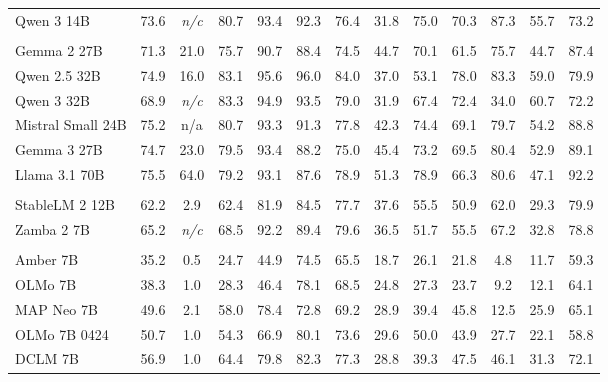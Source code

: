 \documentclass[table]{ai2style/ai2}
\begin{document}
\begin{table}[ht!]
\begin{center}
\begin{small}
\begin{tabular}{lcc|cccccc|cccc}
\rowcolor{lightgrey} Qwen 3 14B & 73.6 & \emph{n/c} & 80.7 & 93.4 & 92.3 & 76.4 & 31.8 & 75.0 & 70.3 & 87.3 & 55.7 & 73.2\\
\rowcolor{midgrey} 
\multicolumn{13}{c}{\textbf{Open-weights models 24-70B Parameters}} \\
\rowcolor{lightgrey} Gemma 2 27B & 71.3 & 21.0 & 75.7 & 90.7 & 88.4 & 74.5 & 44.7 & 70.1 & 61.5 & 75.7 & 44.7 & 87.4 \\
\rowcolor{lightgrey} Qwen 2.5 32B & 74.9 & 16.0 & 83.1 & 95.6 & 96.0 & 84.0 & 37.0 & 53.1 & 78.0 & 83.3 & 59.0 & 79.9 \\
\rowcolor{lightgrey} Qwen 3 32B & 68.9 & \emph{n/c} & 83.3 & 94.9 & 93.5 & 79.0 & 31.9 & 67.4 & 72.4 & 34.0 & 60.7 & 72.2 \\
\rowcolor{lightgrey} Mistral Small 24B & 75.2 & n/a & 80.7 & 93.3 & 91.3 & 77.8 & 42.3 & 74.4 & 69.1 & 79.7 & 54.2 & 88.8 \\
\rowcolor{lightgrey} Gemma 3 27B & 74.7 & 23.0 & 79.5 & 93.4 & 88.2 & 75.0 & 45.4 & 73.2 & 69.5 & 80.4 & 52.9 & 89.1 \\
\rowcolor{lightgrey} Llama 3.1 70B & 75.5 & 64.0 & 79.2 & 93.1 & 87.6 & 78.9 & 51.3 & 78.9 & 66.3 & 80.6 & 47.1 & 92.2 \\
\rowcolor{ai2midwhite}\multicolumn{13}{c}{\textbf{Models with \textit{partially available} data}} \\
\rowcolor{ai2offwhite} StableLM 2 12B & 62.2 & 2.9 & 62.4 & 81.9 & 84.5 & 77.7 & 37.6 & 55.5 & 50.9 & 62.0 & 29.3 & 79.9 \\
\rowcolor{ai2offwhite} Zamba 2 7B & 65.2 & \textit{n/c} & 68.5 & 92.2 & 89.4 & 79.6 & 36.5 & 51.7 & 55.5 & 67.2 & 32.8 & 78.8 \\
\rowcolor{ai2midpink}\multicolumn{13}{c}{\textbf{\textit{Fully-open} models}} \\
\rowcolor{ai2lightpink} Amber 7B & 35.2 & 0.5 & 24.7 & 44.9 & 74.5 & 65.5 & 18.7 & 26.1 & 21.8 & 4.8 & 11.7 & 59.3 \\
\rowcolor{ai2lightpink} OLMo 7B & 38.3 & 1.0 & 28.3 & 46.4 & 78.1 & 68.5 & 24.8 & 27.3 & 23.7 & 9.2 & 12.1 & 64.1 \\
\rowcolor{ai2lightpink} MAP Neo 7B & 49.6 & 2.1 & 58.0 & 78.4 & 72.8 & 69.2 & 28.9 & 39.4 & 45.8 & 12.5 & 25.9 & 65.1 \\
\rowcolor{ai2lightpink} OLMo 7B 0424 & 50.7 & 1.0 & 54.3 & 66.9 & 80.1 & 73.6 & 29.6 & 50.0 & 43.9 & 27.7 & 22.1 & 58.8 \\
\rowcolor{ai2lightpink} DCLM 7B & 56.9 & 1.0 & 64.4 & 79.8 & 82.3 & 77.3 & 28.8 & 39.3 & 47.5 & 46.1 & 31.3 & 72.1 \\ 

\end{tabular}
\end{small}
\end{center}
\end{table}
\end{document}
